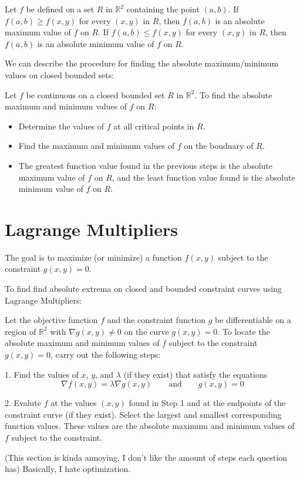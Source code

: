 \documentclass[../calc3.tex]{subfiles}
\begin{document}
\begin{definition}
    Let $f$ be defined on a set $R$ in $\mathbb{R}^2$ containing the point $(a,b)$. If $f(a,b)\geq f(x,y)$
    for every $(x,y)$ in $R$, then $f(a,b)$ is an absolute maximum value of $f$ on $R$. 
    If $f(a,b)\leq f(x,y)$ for every $(x,y)$ in $R$, then $f(a,b)$ is an absolute minimum value of $f$ on $R$.
\end{definition}

We can describe the procedure for finding the absolute maximum/minimum values on closed bounded sets:

Let $f$ be continuous on a closed bounded set $R$ in $\mathbb{R}^2$. To find the absolute maximum and minimum values of $f$ on $R$:
\begin{itemize}
    \item Determine the values of $f$ at all critical points in $R$.
    \item Find the maximum and minimum values of $f$ on the boudnary of $R$.
    \item The greatest function value found in the previous steps is the absolute maximum value of $f$ on $R$, and the least 
    function value found is the absolute minimum value of $f$ on $R$.
\end{itemize}
\section{Lagrange Multipliers}
The goal is to maximize (or minimize) a function $f(x,y)$ subject to the 
constraint $g(x,y) = 0$.

To find find absolute extrema on closed and bounded constraint curves using Lagrange Multipliers:

Let the objective function $f$ and the constraint function $g$ be differentiable on a region of 
$\mathbb{R}^2$ with $\nabla g(x,y)\neq 0$ on the curve $g(x,y)=0$. To locate the absolute 
maximum and minimum values of $f$ subject to the constraint $g(x,y)=0$, carry out the following steps:

1. Find the values of $x$, $y$, and $\lambda$ (if they exist) that satisfy the equations
\[\nabla f(x,y) = \lambda \nabla g(x,y)\qquad \text{and} \qquad g(x,y)=0\]

2. Evalute $f$ at the values $(x,y)$ found in Step 1 and at the endpoints of the constraint curve (if they exist).
Select the largest and smallest corresponding function values. These values are the absolute maximum and minimum values 
of $f$ subject to the constraint. 

(This section is kinda annoying, I don't like the amount of steps each question has) Basically, I hate optimization.
\end{document}
